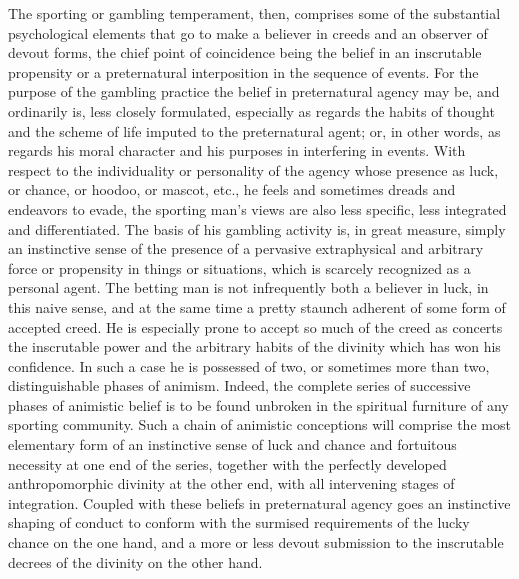 \documentclass[12pt]{report}
\begin{document}
The sporting or gambling temperament, then, comprises some of the
substantial psychological elements that go to make a believer in creeds
and an observer of devout forms, the chief point of coincidence being
the belief in an inscrutable propensity or a preternatural interposition
in the sequence of events. For the purpose of the gambling practice the
belief in preternatural agency may be, and ordinarily is, less closely
formulated, especially as regards the habits of thought and the scheme
of life imputed to the preternatural agent; or, in other words, as
regards his moral character and his purposes in interfering in events.
With respect to the individuality or personality of the agency whose
presence as luck, or chance, or hoodoo, or mascot, etc., he feels and
sometimes dreads and endeavors to evade, the sporting man's views are
also less specific, less integrated and differentiated. The basis of his
gambling activity is, in great measure, simply an instinctive sense
of the presence of a pervasive extraphysical and arbitrary force or
propensity in things or situations, which is scarcely recognized as a
personal agent. The betting man is not infrequently both a believer
in luck, in this naive sense, and at the same time a pretty staunch
adherent of some form of accepted creed. He is especially prone to
accept so much of the creed as concerts the inscrutable power and the
arbitrary habits of the divinity which has won his confidence. In such a
case he is possessed of two, or sometimes more than two, distinguishable
phases of animism. Indeed, the complete series of successive phases of
animistic belief is to be found unbroken in the spiritual furniture
of any sporting community. Such a chain of animistic conceptions will
comprise the most elementary form of an instinctive sense of luck and
chance and fortuitous necessity at one end of the series, together with
the perfectly developed anthropomorphic divinity at the other end, with
all intervening stages of integration. Coupled with these beliefs in
preternatural agency goes an instinctive shaping of conduct to conform
with the surmised requirements of the lucky chance on the one hand,
and a more or less devout submission to the inscrutable decrees of the
divinity on the other hand.
\end{document}
